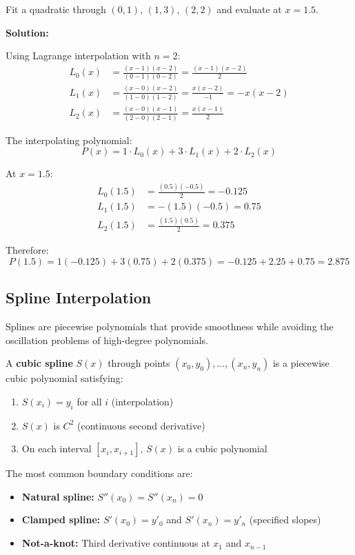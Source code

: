 \begin{examplebox}[title=Example 11.11: Quadratic Interpolation]
Fit a quadratic through $(0, 1)$, $(1, 3)$, $(2, 2)$ and evaluate at $x = 1.5$.

\textbf{Solution:}

Using Lagrange interpolation with $n = 2$:
\begin{align*}
L_0(x) &= \frac{(x-1)(x-2)}{(0-1)(0-2)} = \frac{(x-1)(x-2)}{2} \\
L_1(x) &= \frac{(x-0)(x-2)}{(1-0)(1-2)} = \frac{x(x-2)}{-1} = -x(x-2) \\
L_2(x) &= \frac{(x-0)(x-1)}{(2-0)(2-1)} = \frac{x(x-1)}{2}
\end{align*}

The interpolating polynomial:
\begin{equation*}
P(x) = 1 \cdot L_0(x) + 3 \cdot L_1(x) + 2 \cdot L_2(x)
\end{equation*}

At $x = 1.5$:
\begin{align*}
L_0(1.5) &= \frac{(0.5)(-0.5)}{2} = -0.125 \\
L_1(1.5) &= -(1.5)(-0.5) = 0.75 \\
L_2(1.5) &= \frac{(1.5)(0.5)}{2} = 0.375
\end{align*}

Therefore:
\begin{equation*}
P(1.5) = 1(-0.125) + 3(0.75) + 2(0.375) = -0.125 + 2.25 + 0.75 = 2.875
\end{equation*}
\end{examplebox}

\subsection{Spline Interpolation}

Splines are piecewise polynomials that provide smoothness while avoiding the oscillation problems of high-degree polynomials.

\begin{definitionbox}[title=Definition 11.17: Cubic Spline]
A \textbf{cubic spline} $S(x)$ through points $(x_0, y_0), \ldots, (x_n, y_n)$ is a piecewise cubic polynomial satisfying:
\begin{enumerate}
    \item $S(x_i) = y_i$ for all $i$ (interpolation)
    \item $S(x)$ is $C^2$ (continuous second derivative)
    \item On each interval $[x_i, x_{i+1}]$, $S(x)$ is a cubic polynomial
\end{enumerate}

The most common boundary conditions are:
\begin{itemize}
    \item \textbf{Natural spline:} $S''(x_0) = S''(x_n) = 0$
    \item \textbf{Clamped spline:} $S'(x_0) = y'_0$ and $S'(x_n) = y'_n$ (specified slopes)
    \item \textbf{Not-a-knot:} Third derivative continuous at $x_1$ and $x_{n-1}$
\end{itemize}
\end{definitionbox}


